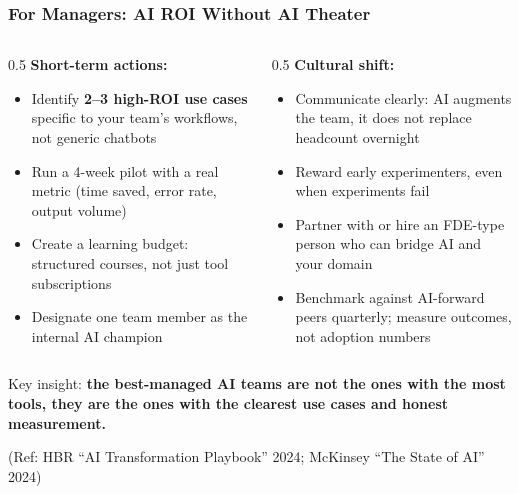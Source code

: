 \begin{frame}[fragile]\frametitle{For Managers: AI ROI Without AI Theater}

\begin{columns}
    \begin{column}[T]{0.5\linewidth}
\textbf{Short-term actions:}
\begin{itemize}
\item Identify \textbf{2--3 high-ROI use cases} specific to your team's workflows, not generic chatbots
\item Run a 4-week pilot with a real metric (time saved, error rate, output volume)
\item Create a learning budget: structured courses, not just tool subscriptions
\item Designate one team member as the internal AI champion
\end{itemize}
    \end{column}
    \begin{column}[T]{0.5\linewidth}
\textbf{Cultural shift:}
\begin{itemize}
\item Communicate clearly: AI augments the team, it does not replace headcount overnight
\item Reward early experimenters, even when experiments fail
\item Partner with or hire an FDE-type person who can bridge AI and your domain
\item Benchmark against AI-forward peers quarterly; measure outcomes, not adoption numbers
\end{itemize}
    \end{column}
\end{columns}

\vspace{0.2cm}
{\small Key insight: \textbf{the best-managed AI teams are not the ones with the most tools, they are the ones with the clearest use cases and honest measurement.}}

{\tiny (Ref: HBR ``AI Transformation Playbook'' 2024; McKinsey ``The State of AI'' 2024)}
\end{frame}


